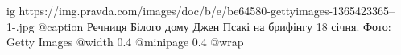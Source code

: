  
 
 
 
 

\ifcmt
  ig https://img.pravda.com/images/doc/b/e/be64580-gettyimages-1365423365--1-.jpg
  @caption Речниця Білого дому Джен Псакі на брифінгу 18 січня. Фото: Getty Images
  @width 0.4
  @minipage 0.4
  @wrap \parpic[r]
\fi
